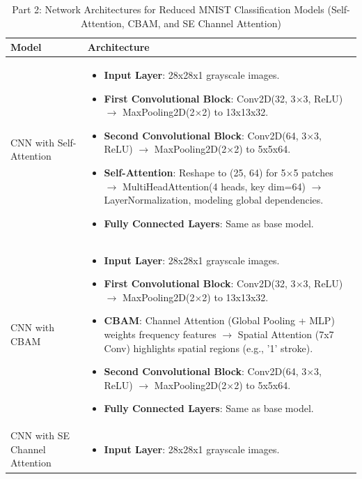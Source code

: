 \documentclass[12pt]{article}
\begin{document}
\begin{table}[H]
    \centering
    \caption{Part 2: Network Architectures for Reduced MNIST Classification Models (Self-Attention, CBAM, and SE Channel Attention)}
    \label{tab:architectures_part2}
    \begin{tabularx}{\textwidth}{l X}
        \toprule
        \textbf{Model} & \textbf{Architecture} \\
        \midrule
        CNN with Self-Attention & 
        \begin{itemize}
            \item \textbf{Input Layer}: 28x28x1 grayscale images.
            \item \textbf{First Convolutional Block}: Conv2D(32, 3$\times$3, ReLU) $\rightarrow$ MaxPooling2D(2$\times$2) to 13x13x32.
            \item \textbf{Second Convolutional Block}: Conv2D(64, 3$\times$3, ReLU) $\rightarrow$ MaxPooling2D(2$\times$2) to 5x5x64.
            \item \textbf{Self-Attention}: Reshape to (25, 64) for 5$\times$5 patches $\rightarrow$ MultiHeadAttention(4 heads, key dim=64) $\rightarrow$ LayerNormalization, modeling global dependencies.
            \item \textbf{Fully Connected Layers}: Same as base model.
        \end{itemize} \\
        \midrule
        CNN with CBAM & 
        \begin{itemize}
            \item \textbf{Input Layer}: 28x28x1 grayscale images.
            \item \textbf{First Convolutional Block}: Conv2D(32, 3$\times$3, ReLU) $\rightarrow$ MaxPooling2D(2$\times$2) to 13x13x32.
            \item \textbf{CBAM}: Channel Attention (Global Pooling + MLP) weights frequency features $\rightarrow$ Spatial Attention (7x7 Conv) highlights spatial regions (e.g., '1' stroke).
            \item \textbf{Second Convolutional Block}: Conv2D(64, 3$\times$3, ReLU) $\rightarrow$ MaxPooling2D(2$\times$2) to 5x5x64.
            \item \textbf{Fully Connected Layers}: Same as base model.
        \end{itemize} \\
        \midrule
        CNN with SE Channel Attention & 
        \begin{itemize}
            \item \textbf{Input Layer}: 28x28x1 grayscale images.

\end{itemize}
\end{tabularx}
\end{table}
\end{document}
